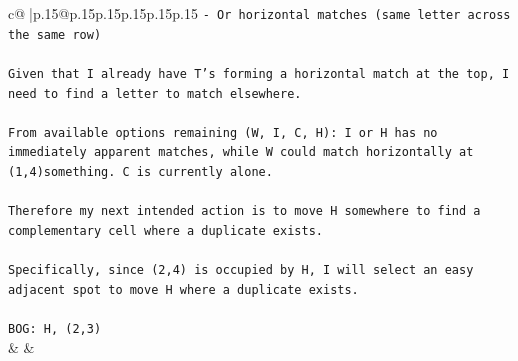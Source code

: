 \documentclass{article}
\begin{document}
{\begin{supertabular}{c@{$\;$}|p{.15\linewidth}@{}p{.15\linewidth}p{.15\linewidth}p{.15\linewidth}p{.15\linewidth}p{.15\linewidth}}
{{{\texttt{{-} Or horizontal matches (same letter across the same row)} \\
\\ 
\texttt{Given that I already have T's forming a horizontal match at the top, I need to find a letter to match elsewhere.} \\
\\ 
\texttt{From available options remaining (W, I, C, H): I or H has no immediately apparent matches, while W could match horizontally at (1,4)something. C is currently alone.} \\
\\ 
\texttt{Therefore my next intended action is to move H somewhere to find a complementary cell where a duplicate exists.} \\
\\ 
\texttt{Specifically, since (2,4) is occupied by H, I will select an easy adjacent spot to move H where a duplicate exists.} \\
\\ 
\texttt{BOG: H, (2,3)} \\
            }
        }
    }
    & & \\ \\


\end{supertabular}}
\end{document}
